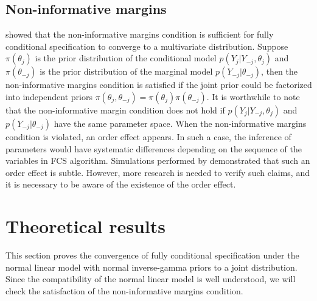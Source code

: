 	\subsection{Non-informative margins}
	\citet{hughes2014joint} showed that the non-informative margins condition is sufficient for fully conditional specification to converge to a multivariate distribution. Suppose $\pi(\theta_{j})$ is the prior distribution of the conditional model $p(Y_j|Y_{-j}, \theta_{j})$ and $\pi(\theta_{-j})$ is the prior distribution of the marginal model $p(Y_{-j}|\theta_{-j})$, then the non-informative margins condition is satisfied if the joint prior could be factorized into independent priors $\pi(\theta_{j}, \theta_{-j}) = \pi(\theta_{j})\pi(\theta_{-j})$. It is worthwhile to note that the non-informative margin condition does not hold if $p(Y_j|Y_{-j}, \theta_{j})$ and $p(Y_{-j}|\theta_{-j})$ have the same parameter space. When the non-informative margins condition is violated, an order effect appears. In such a case, the inference of parameters would have systematic differences depending on the sequence of the variables in FCS algorithm. Simulations performed by \citet{hughes2014joint} demonstrated that such an order effect is subtle. However, more research is needed to verify such claims, and it is necessary to be aware of the existence of the order effect. 
	
	\section{Theoretical results}
	This section proves the convergence of fully conditional specification under the normal linear model with normal inverse-gamma priors to a joint distribution. Since the compatibility of the normal linear model is well understood,  we will check the satisfaction of the non-informative margins condition. 
	
